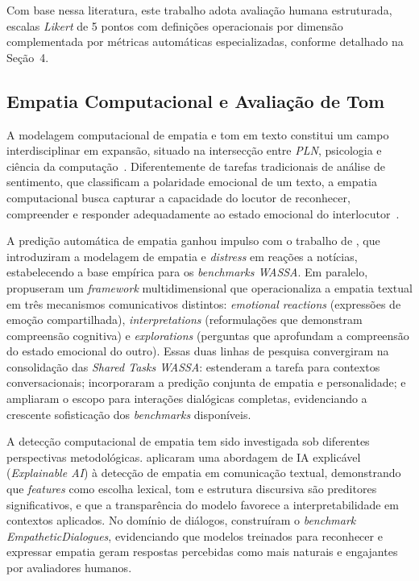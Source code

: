\documentclass[12pt, a4paper]{article}
\numberwithin{equation}{section}
\begin{document}
Com base nessa literatura, este trabalho adota avaliação humana estruturada, escalas \textit{Likert} de 5 pontos com definições operacionais por dimensão complementada por métricas automáticas especializadas, conforme detalhado na Seção~4.

\subsection{Empatia Computacional e Avaliação de Tom}

A modelagem computacional de empatia e tom em texto constitui um campo interdisciplinar em expansão, situado na intersecção entre \textit{PLN}, psicologia e ciência da computação~\cite{yalcin2019}. Diferentemente de tarefas tradicionais de análise de sentimento, que classificam a polaridade emocional de um texto, a empatia computacional busca capturar a capacidade do locutor de reconhecer, compreender e responder adequadamente ao estado emocional do interlocutor~\cite{sharma2020}.

A predição automática de empatia ganhou impulso com o trabalho de , que introduziram a modelagem de empatia e \textit{distress} em reações a notícias, estabelecendo a base empírica para os \textit{benchmarks WASSA}. Em paralelo,  propuseram um \textit{framework} multidimensional que operacionaliza a empatia textual em três mecanismos comunicativos distintos: \textit{emotional reactions} (expressões de emoção compartilhada), \textit{interpretations} (reformulações que demonstram compreensão cognitiva) e \textit{explorations} (perguntas que aprofundam a compreensão do estado emocional do outro). Essas duas linhas de pesquisa convergiram na consolidação das \textit{Shared Tasks WASSA}:  estenderam a tarefa para contextos conversacionais;  incorporaram a predição conjunta de empatia e personalidade; e  ampliaram o escopo para interações dialógicas completas, evidenciando a crescente sofisticação dos \textit{benchmarks} disponíveis.

A detecção computacional de empatia tem sido investigada sob diferentes perspectivas metodológicas.  aplicaram uma abordagem de IA explicável (\textit{Explainable AI}) à detecção de empatia em comunicação textual, demonstrando que \textit{features} como escolha lexical, tom e estrutura discursiva são preditores significativos, e que a transparência do modelo favorece a interpretabilidade em contextos aplicados. No domínio de diálogos,  construíram o \textit{benchmark EmpatheticDialogues}, evidenciando que modelos treinados para reconhecer e expressar empatia geram respostas percebidas como mais naturais e engajantes por avaliadores humanos.
\end{document}
